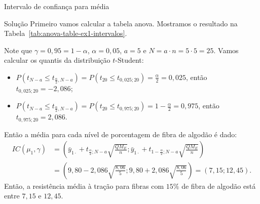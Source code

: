 \documentclass[8pt]{beamer}
\begin{document}
\begin{frame}{Intervalo de confiança para média}

\footnotesize
\begin{block}{Solução}
	Primeiro vamos calcular a tabela anova. Mostramos o resultado na Tabela~\ref{tab:anova-table-ex1-intervalos}.
	\begin{table}[ht]
		\centering
		\caption{Tabela ANOVA.} 
		\label{tab:anova-table-ex1-intervalos}
	\end{table}
	
	Note que $\gamma = 0,95 = 1 - \alpha$, $\alpha = 0,05$, $a=5$ e $N = a \cdot n = 5 \cdot 5 = 25$. Vamos calcular os quantis da distribuição $t$-Student:
	\begin{itemize}
		\item $P\left( t_{N - a} \leq t_{\frac{\alpha}{2}, N - a} \right) = P\left( t_{20} \leq t_{0,025; 20} \right) = \frac{\alpha}{2} = 0,025$, então $t_{0,025; 20} = - 2,086$;
		\item $P\left( t_{N - a} \leq t_{\frac{\alpha}{2}, N - a} \right) = P\left( t_{20} \leq t_{0,975; 20} \right) = 1- \frac{\alpha}{2} = 0,975$, então $t_{0,975; 20} =  2,086$.
	\end{itemize}
	
	Então a média para cada nível de porcentagem de fibra de algodão é dado:
	\begin{align*}
	IC(\mu_1, \gamma) &= \left( \bar{y}_{1\cdot} + t_{\frac{\alpha}{2};N - a} \sqrt{\frac{QM_E}{n}};  \bar{y}_{1\cdot} + t_{1-\frac{\alpha}{2};N - a} \sqrt{\frac{QM_E}{n}}  \right)\\
	&= \left( 9,80 - 2,086 \sqrt{\frac{8,06}{5}}; 9,80 + 2,086 \sqrt{\frac{8,06}{5}} \right) = \left( 7,15; 12,45 \right).
	\end{align*}
	Então, a resistência média à tração para fibras com $15\%$ de fibra de algodão está entre $7,15$ e $12,45$.
\end{block}
\normalsize

\end{frame}
\end{document}
